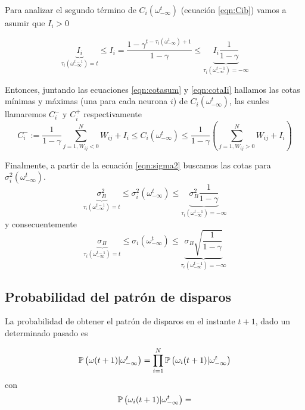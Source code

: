 Para analizar el segundo término de $C_i(\omega_{-\infty}^t)$ (ecuación \eqref{eqn:Cib}) vamos a asumir que $I_i > 0$

\begin{equation}
     \underbrace{I_i}_{\tau_i(\omega_{-\infty}^{t-1})=t} \leq
     I_i = \frac{1-\gamma^{t-\tau_i(\omega_{-\infty}^t)+1}}{1-\gamma} \leq
     \underbrace{I_i \frac{1}{1-\gamma}}_{\tau_i(\omega_{-\infty}^{t-1})=-\infty}
     \label{eqn:cotaIi}
\end{equation}

Entonces, juntando las ecuaciones \eqref{eqn:cotasum} y \eqref{eqn:cotaIi} hallamos las cotas mínimas y máximas (una para cada neurona $i$) de $C_i(\omega_{-\infty}^t)$, las cuales llamaremos $C_i^-$ y $C_i^+$ respectivamente
\begin{equation}
     C_i^- :=  \frac{1}{1-\gamma}\sum_{j=1, W_{ij}<0}^N W_{ij} + I_i 
     \leq C_i(\omega_{-\infty}^t) \leq
     \frac{1}{1-\gamma} \left( \sum_{j=1, W_{ij}>0}^N W_{ij} + I_i \right)
     \label{eqn:cotaCi}
\end{equation}

Finalmente, a partir de la ecuación \eqref{eqn:sigma2} buscamos las cotas para $\sigma_i^2(\omega_{-\infty}^t)$.
\begin{equation}
     \underbrace{\sigma_B^2}_{\tau_i(\omega_{-\infty}^{t-1})=t} \leq
     \sigma_i^2(\omega_{-\infty}^t) \leq
     \underbrace{\sigma_B^2 \frac{1}{1-\gamma}}_{\tau_i(\omega_{-\infty}^{t-1})=-\infty}
     \label{eqn:cotaSigma2}
\end{equation}
y consecuentemente
\begin{equation}
     \underbrace{\sigma_B}_{\tau_i(\omega_{-\infty}^{t-1})=t} \leq
     \sigma_i(\omega_{-\infty}^t) \leq
     \underbrace{\sigma_B \sqrt{\frac{1}{1-\gamma}}}_{\tau_i(\omega_{-\infty}^{t-1})=-\infty}
     \label{eqn:cotaSigma}
\end{equation}

\subsection{Probabilidad del patrón de disparos}

\begin{prop}\label{prop:probpatron}
La probabilidad de obtener el patrón de disparos en el instante $t+1$, dado un determinado pasado es

\begin{equation}
    \mathbb{P}\left(\omega(t+1) | \omega^t_{-\infty}\right)=\prod_{i=1}^N \mathbb{P}\left(\omega_i(t+1)|\omega_{-\infty}^t\right)
\end{equation}
con
\begin{equation}
    \mathbb{P}\left(\omega_i(t+1)|\omega_{-\infty}^t\right) = 
\end{equation}
\end{prop}

